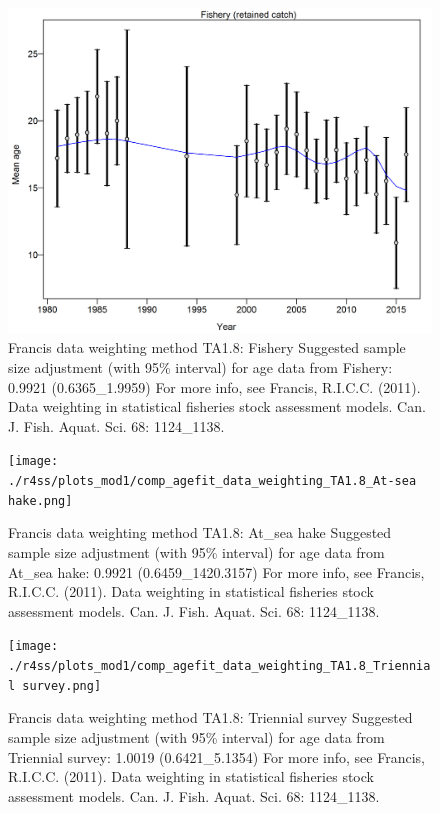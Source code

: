 \documentclass[12pt,]{article}
\begin{document}
\begin{figure}
\centering
\includegraphics{./r4ss/plots_mod1/comp_agefit_data_weighting_TA1.8_Fishery.png}
\caption{Francis data weighting method TA1.8: Fishery Suggested sample
size adjustment (with 95\% interval) for age data from Fishery: 0.9921
(0.6365\_1.9959) For more info, see Francis, R.I.C.C. (2011). Data
weighting in statistical fisheries stock assessment models. Can. J.
Fish. Aquat. Sci. 68: 1124\_1138. \label{fig:weighting_fishery}}
\end{figure}

\begin{figure}
\centering
\texttt{[image: ./r4ss/plots\_mod1/comp\_agefit\_data\_weighting\_TA1.8\_At-sea hake.png]}
\caption{Francis data weighting method TA1.8: At\_sea hake Suggested
sample size adjustment (with 95\% interval) for age data from At\_sea
hake: 0.9921 (0.6459\_1420.3157) For more info, see Francis, R.I.C.C.
(2011). Data weighting in statistical fisheries stock assessment models.
Can. J. Fish. Aquat. Sci. 68: 1124\_1138. \label{fig:weighting_ashop}}
\end{figure}

\begin{figure}
\centering
\texttt{[image: ./r4ss/plots\_mod1/comp\_agefit\_data\_weighting\_TA1.8\_Triennial survey.png]}
\caption{Francis data weighting method TA1.8: Triennial survey Suggested
sample size adjustment (with 95\% interval) for age data from Triennial
survey: 1.0019 (0.6421\_5.1354) For more info, see Francis, R.I.C.C.
(2011). Data weighting in statistical fisheries stock assessment models.
Can. J. Fish. Aquat. Sci. 68: 1124\_1138.
\label{fig:weighting_triennial}}
\end{figure}
\end{document}
